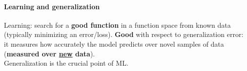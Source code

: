 \documentclass[10pt]{report}
\begin{document}
\paragraph{Learning and generalization} Learning: search for a \textbf{good function} in a function space from known data (typically minimizing an error/loss). \textbf{Good} with respect to generalization error: it measures how accurately the model predicts over novel samples of data (\textbf{measured over \underline{new} data}).\\
Generalization is the crucial point of ML.
\end{document}
